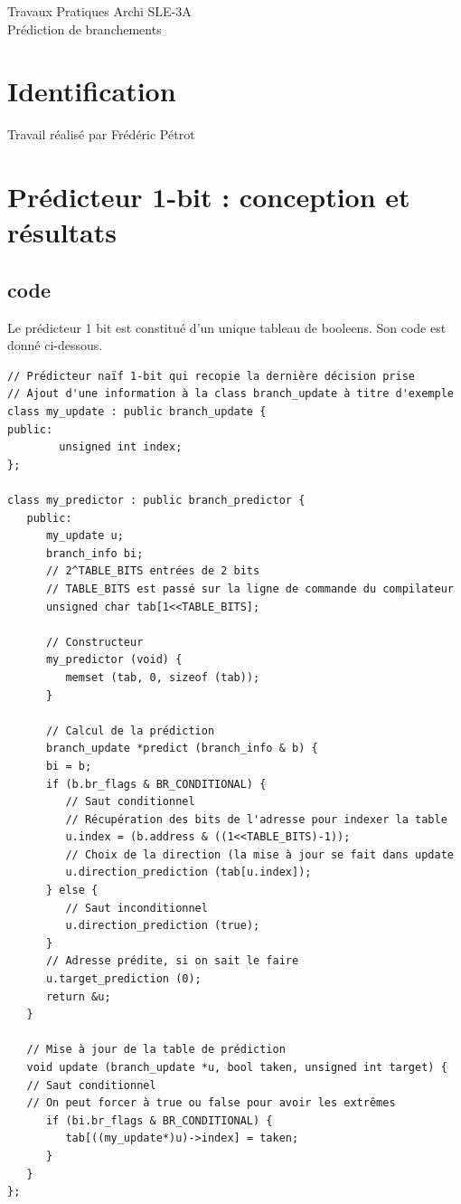 \documentclass[a4paper]{article}
\begin{document}
\begin{center}
\large
Travaux Pratiques Archi SLE-3A\\
\LARGE
Prédiction de branchements\\
\large

\end{center}
\section{Identification}
Travail réalisé par Frédéric Pétrot

\section{Prédicteur 1-bit : conception et résultats}
\subsection{code}
Le prédicteur 1 bit est constitué d'un unique tableau de booleens.
Son code est donné ci-dessous.
\small
\begin{verbatim}
// Prédicteur naïf 1-bit qui recopie la dernière décision prise
// Ajout d'une information à la class branch_update à titre d'exemple
class my_update : public branch_update {
public:
        unsigned int index;
};

class my_predictor : public branch_predictor {
   public:
      my_update u;
      branch_info bi;
      // 2^TABLE_BITS entrées de 2 bits
      // TABLE_BITS est passé sur la ligne de commande du compilateur
      unsigned char tab[1<<TABLE_BITS];

      // Constructeur
      my_predictor (void) { 
         memset (tab, 0, sizeof (tab));
      }

      // Calcul de la prédiction
      branch_update *predict (branch_info & b) {
      bi = b;
      if (b.br_flags & BR_CONDITIONAL) {
         // Saut conditionnel
         // Récupération des bits de l'adresse pour indexer la table
         u.index = (b.address & ((1<<TABLE_BITS)-1));
         // Choix de la direction (la mise à jour se fait dans update
         u.direction_prediction (tab[u.index]);
      } else {
         // Saut inconditionnel
         u.direction_prediction (true);
      }
      // Adresse prédite, si on sait le faire
      u.target_prediction (0);
      return &u;
   }

   // Mise à jour de la table de prédiction
   void update (branch_update *u, bool taken, unsigned int target) {
   // Saut conditionnel
   // On peut forcer à true ou false pour avoir les extrêmes
      if (bi.br_flags & BR_CONDITIONAL) {
         tab[((my_update*)u)->index] = taken;
      }
   }
};

\end{verbatim}
\normalsize
\end{document}

